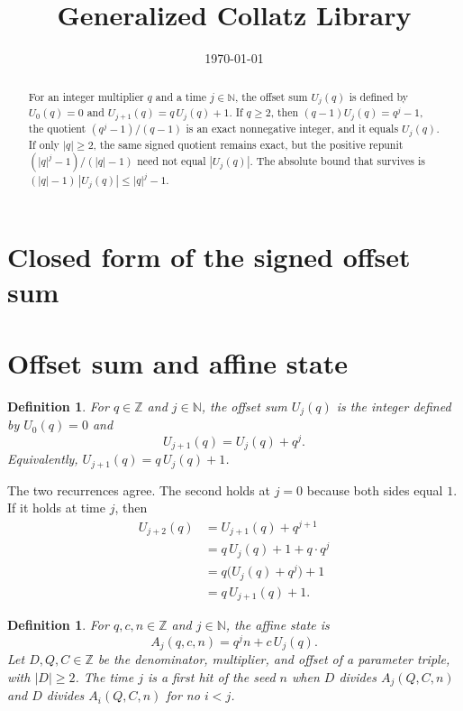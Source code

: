 \documentclass[11pt,letterpaper]{article}
\title{Generalized Collatz Library}
\author{}
\date{\today}
\newcommand{\N}{\mathbb{N}}
\newcommand{\Z}{\mathbb{Z}}
\newtheorem{definition}[theorem]{Definition}
\begin{document}
\maketitle
\section*{Closed form of the signed offset sum}

\begin{abstract}
For an integer multiplier \(q\) and a time \(j\in\N\), the offset sum \(U_j(q)\) is defined by \(U_0(q)=0\) and \(U_{j+1}(q)=q\,U_j(q)+1\). If \(q\ge 2\), then \((q-1)U_j(q)=q^j-1\), the quotient \((q^j-1)/(q-1)\) is an exact nonnegative integer, and it equals \(U_j(q)\). If only \(|q|\ge 2\), the same signed quotient remains exact, but the positive repunit \((|q|^j-1)/(|q|-1)\) need not equal \(|U_j(q)|\). The absolute bound that survives is \((|q|-1)\,|U_j(q)|\le |q|^j-1\).
\end{abstract}

\section{Offset sum and affine state}

\begin{definition}
\label{def:offset}
For \(q\in\Z\) and \(j\in\N\), the offset sum \(U_j(q)\) is the integer defined by \(U_0(q)=0\) and
\[
U_{j+1}(q)=U_j(q)+q^j.
\]
Equivalently, \(U_{j+1}(q)=q\,U_j(q)+1\).
\end{definition}

The two recurrences agree. The second holds at \(j=0\) because both sides equal \(1\). If it holds at time \(j\), then
\begin{align*}
U_{j+2}(q)
&=U_{j+1}(q)+q^{j+1}\\
&=q\,U_j(q)+1+q\cdot q^j\\
&=q\bigl(U_j(q)+q^j\bigr)+1\\
&=q\,U_{j+1}(q)+1.
\end{align*}

\begin{definition}
\label{def:affine}
For \(q,c,n\in\Z\) and \(j\in\N\), the affine state is
\[
A_j(q,c,n)=q^j n+c\,U_j(q).
\]
Let \(D,Q,C\in\Z\) be the denominator, multiplier, and offset of a parameter triple, with \(|D|\ge 2\). The time \(j\) is a first hit of the seed \(n\) when \(D\) divides \(A_j(Q,C,n)\) and \(D\) divides \(A_i(Q,C,n)\) for no \(i<j\).
\end{definition}
\end{document}
